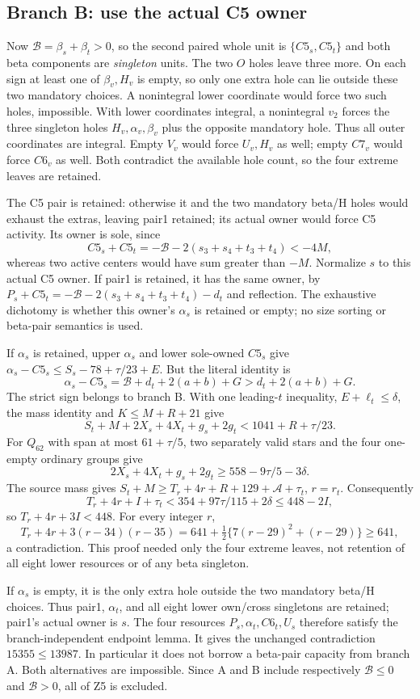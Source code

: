 \documentclass[11pt,letterpaper]{article}
\theoremstyle{definition}\newtheorem{definition}[theorem]{Definition}
\begin{document}
\subsection{Branch B: use the actual C5 owner}
Now $\mathcal B=\beta_s+\beta_t>0$, so the second paired whole unit is
$\{C5_s,C5_t\}$ and both beta components are \emph{singleton} units.
The two $O$ holes leave three more. On each sign at least one of
$\beta_v,H_v$ is empty, so only one extra hole can lie outside these
two mandatory choices. A nonintegral lower coordinate would force two
such holes, impossible. With lower coordinates integral, a nonintegral
$v_2$ forces the three singleton holes $H_v,\alpha_v,\beta_v$ plus
the opposite mandatory hole. Thus all outer coordinates are integral.
Empty $V_v$ would force $U_v,H_v$ as well; empty $C7_v$ would force
$C6_v$ as well. Both contradict the available hole count, so the four
extreme leaves are retained.

The C5 pair is retained: otherwise it and the two mandatory beta/H holes
would exhaust the extras, leaving pair1 retained; its actual owner would
force C5 activity. Its owner is sole, since
\[
 C5_s+C5_t=-\mathcal B-2(s_3+s_4+t_3+t_4)<-4M,
\]
whereas two active centers would have sum greater than $-M$.
Normalize $s$ to this actual C5 owner. If pair1 is retained, it has the
same owner, by
$P_s+C5_t=-\mathcal B-2(s_3+s_4+t_3+t_4)-d_t$ and reflection.
The exhaustive dichotomy is whether this owner's $\alpha_s$ is retained
or empty; no size sorting or beta-pair semantics is used.

If $\alpha_s$ is retained, upper $\alpha_s$ and lower sole-owned
$C5_s$ give
$\alpha_s-C5_s\le S_s-78+\tau/23+E$.
But the literal identity is
\[
 \alpha_s-C5_s=\mathcal B+d_t+2(a+b)+G>d_t+2(a+b)+G.
\]
The strict sign belongs to branch B. With one leading-$t$ inequality,
$E+\ell_t\le\delta$, the mass identity and $K\le M+R+21$ give
\[
 S_t+M+2X_s+4X_t+g_s+2g_t<1041+R+\tau/23.
\]
For $Q_{62}$ with span at most $61+\tau/5$, two separately valid
stars and the four one-empty ordinary groups give
\[
 2X_s+4X_t+g_s+2g_t\ge558-9\tau/5-3\delta.
\]
The source mass gives
$S_t+M\ge T_r+4r+R+129+\mathcal A+\tau_t$, $r=r_t$.
Consequently
\[
 T_r+4r+I+\tau_t<354+97\tau/115+2\delta
                  \le448-2I,
\]
so $T_r+4r+3I<448$. For every integer $r$,
\[
 T_r+4r+3(r-34)(r-35)
 =641+\tfrac12\{7(r-29)^2+(r-29)\}\ge641,
\]
a contradiction. This proof needed only the four extreme leaves, not
retention of all eight lower resources or of any beta singleton.

If $\alpha_s$ is empty, it is the only extra hole outside the two
mandatory beta/H choices. Thus pair1, $\alpha_t$, and all eight lower
own/cross singletons are retained; pair1's actual owner is $s$.
The four resources $P_s,\alpha_t,C6_t,U_s$ therefore satisfy the
branch-independent endpoint lemma. It gives the unchanged contradiction
$15355\le13987$. In particular it does not borrow a beta-pair capacity
from branch A. Both alternatives are impossible. Since A and B include
respectively $\mathcal B\le0$ and $\mathcal B>0$, all of Z5 is excluded.
\end{document}
